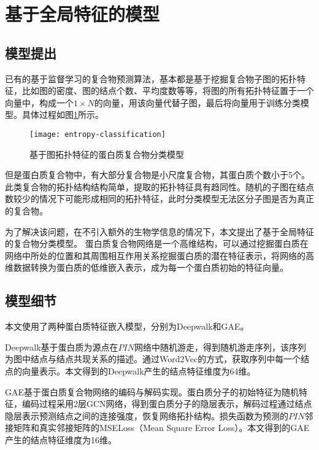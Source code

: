 \section{基于全局特征的模型}
\label{section:GlobalfeatBaseModel}

\subsection{模型提出}
\label{subsection:Global:Modelget}
已有的基于监督学习的复合物预测算法，基本都是基于挖掘复合物子图的拓扑特征，比如图的密度、图的结点个数、平均度数等等，将图的所有拓扑特征置于一个向量中，构成一个$1\times N$的向量，用该向量代替子图，最后将向量用于训练分类模型。具体过程如图\ref{fig:entropy-classification}所示。

\begin{figure}[htbp]
    \centering
    \texttt{[image: entropy-classification]}
    \caption{基于图拓扑特征的蛋白质复合物分类模型}
    \label{fig:entropy-classification}
\end{figure}


但是蛋白质复合物中，有大部分复合物是小尺度复合物，其蛋白质个数小于5个。此类复合物的拓扑结构结构简单，提取的拓扑特征具有趋同性。随机的子图在结点数较少的情况下可能形成相同的拓扑特征，此时分类模型无法区分子图是否为真正的复合物。

为了解决该问题，在不引入额外的生物学信息的情况下，本文提出了基于全局特征的复合物分类模型。
蛋白质复合物网络是一个高维结构，可以通过挖掘蛋白质在网络中所处的位置和其周围相互作用关系挖掘蛋白质的潜在特征表示，将网络的高维数据转换为蛋白质的低维嵌入表示，成为每一个蛋白质初始的特征向量。

\subsection{模型细节}
\label{subsection:Global:Modeldetail}
本文使用了两种蛋白质特征嵌入模型，分别为Deepwalk和GAE。

Deepwalk基于蛋白质为源点在$PIN$网络中随机游走，得到随机游走序列，该序列为图中结点与结点共现关系的描述。通过Word2Vec的方式，获取序列中每一个结点的向量表示。本文得到的Deepwalk产生的结点特征维度为64维。

GAE基于蛋白质复合物网络的编码与解码实现。蛋白质分子的初始特征为随机特征，编码过程采用2层GCN网络，得到蛋白质分子的隐层表示，解码过程通过结点隐层表示预测结点之间的连接强度，恢复网络拓扑结构。损失函数为预测的$PIN$邻接矩阵和真实邻接矩阵的MSELoss（Mean Square Error Loss）。本文得到的GAE产生的结点特征维度为16维。
